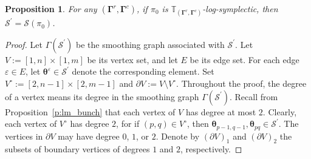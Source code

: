 \documentclass[11pt]{article}
\newcommand{\btheta}{{\boldsymbol{\theta}}}
\newcommand{\bg}{\mathbf{\Gamma}}
\newtheorem{proposition}[theorem]{Proposition}%
\theoremstyle{definition}\newtheorem{definition}[theorem]{Definition}
\theoremstyle{definition}\newtheorem{remark}[theorem]{Remark}
\theoremstyle{remark}
\numberwithin{equation}{section}
\begin{document}
\begin{proposition}\label{p:sp_eqls_sp0}
    For any $(\bg^r,\bg^c)$, if $\pi_0$ is $\mathbb{T}_{(\bg^r,\bg^c)}$-log-symplectic, then $\mathcal{S}^\prime = \mathcal{S}(\pi_0)$.
\end{proposition}
\begin{proof}
    Let $\Gamma(\mathcal{S}^\prime)$ be the smoothing graph associated with $\mathcal{S}^\prime$. Let $V:=[1,n]\times [1,m]$ be its vertex set, and let $E$ be its edge set. For each edge $\varepsilon\in E$, let $\btheta^{\varepsilon} \in \mathcal{S}^\prime$ denote the corresponding element. Set $V^\circ :=[2,n-1]\times[2,m-1]$ and $\partial V:= V \setminus V^{\circ}$.
    Throughout the proof, the degree of a vertex means its degree in the smoothing graph $\Gamma(\mathcal{S}^\prime)$.
    Recall from Proposition~\ref{p:lm_bunch} that each vertex of $V$ has degree at most $2$. Clearly, each vertex of $V^{\circ}$ has degree $2$, for if $(p,q) \in V^{\circ}$, then $\btheta_{p-1,q-1},\btheta_{pq}\in \mathcal{S}^\prime$. The vertices in $\partial V$ may have degree $0$, $1$, or $2$. Denote by $(\partial V)_1$ and $(\partial V)_2$ the subsets of boundary vertices of degrees $1$ and $2$, respectively.
    

\end{proof}
\end{document}
